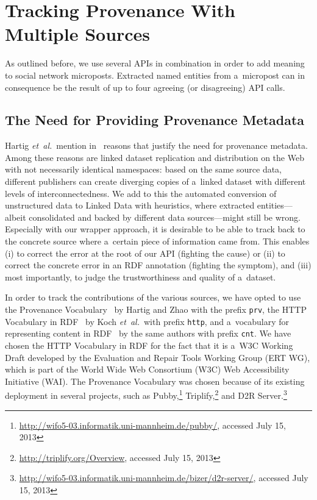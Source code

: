 \section{Tracking Provenance With Multiple Sources}                    \label{sec:tracking}

As outlined before, we use several APIs in combination
in order to add meaning to social network microposts.
Extracted named entities from a~micropost can in consequence
be the result of up to four agreeing (or disagreeing) API calls.

\subsection{The Need for Providing Provenance Metadata}

Hartig \emph{et~al.}\ mention in~\cite{hartig2010provenance}
reasons that justify the need for provenance metadata.
Among these reasons are linked dataset replication and distribution
on the Web with not necessarily identical namespaces:
based on the same source data, different publishers can
create diverging copies of a~linked dataset
with different levels of interconnectedness.
We add to this the automated conversion of unstructured data
to Linked Data with heuristics,
where extracted entities---albeit consolidated
and backed by different data sources---might still be wrong.
Especially with our wrapper approach,
it is desirable to be able to track back to the concrete source
where a~certain piece of information came from.
This enables
(i) to correct the error at the root of our API
(fighting the cause) or
(ii) to correct the concrete error in an RDF annotation
(fighting the symptom), and
(iii) most importantly, to judge the trustworthiness and quality of a~dataset.

In order to track the contributions of the various sources,
we have opted to use the Provenance
Vocabulary~\cite{hartig2012provenance}
by Hartig and Zhao with the prefix \texttt{prv},
the HTTP Vocabulary in RDF~\cite{koch2011http}
by Koch \emph{et~al.}\ with prefix \texttt{http},
and a~vocabulary for representing content in
RDF~\cite{koch2011content}
by the same authors with prefix \texttt{cnt}.
We have chosen the HTTP Vocabulary in RDF for the fact that
it is a~W3C Working Draft developed by the
Evaluation and Repair Tools Working Group (ERT WG),
which is part of the World Wide Web Consortium (W3C)
Web Accessibility Initiative (WAI).
The Provenance Vocabulary was chosen because of its existing
deployment in several projects, such as
Pubby,\footnote{\url{http://wifo5-03.informatik.uni-mannheim.de/pubby/},
accessed July 15, 2013}
Triplify,\footnote{\url{http://triplify.org/Overview},
accessed July 15, 2013}
and D2R
Server.\footnote{\url{http://wifo5-03.informatik.uni-mannheim.de/bizer/d2r-server/},
accessed July 15, 2013}

